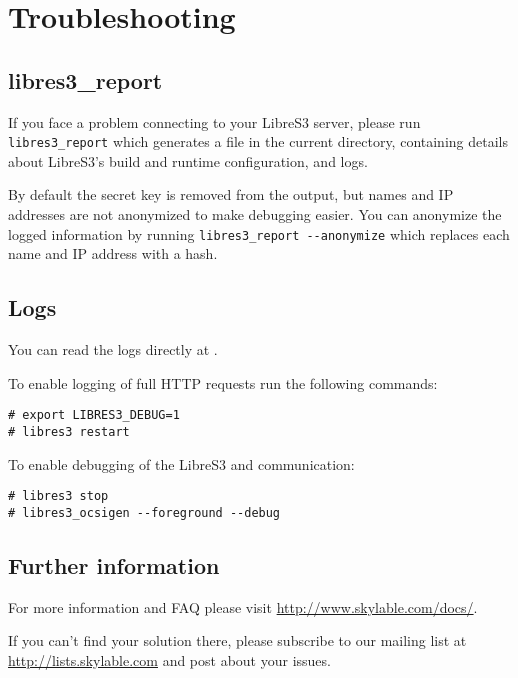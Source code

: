 \chapter{Troubleshooting}
\section{libres3\_report}

If you face a problem connecting to your LibreS3 server, please run
\verb|libres3_report| which generates a file  in the
current directory, containing details about LibreS3's build and runtime
configuration, and logs.

By default the secret key is removed from the output, but names and IP addresses
are not anonymized to make debugging easier.
You can anonymize the logged information by running
 \verb|libres3_report --anonymize| which replaces each name and IP address with
 a hash.

\section{Logs}

You can read the logs directly at .

To enable logging of full HTTP requests run the following commands:

\begin{lstlisting}
# export LIBRES3_DEBUG=1
# libres3 restart
\end{lstlisting}

To enable debugging of the LibreS3 and \SX communication:
\begin{lstlisting}
# libres3 stop
# libres3_ocsigen --foreground --debug
\end{lstlisting}

\section{Further information}

For more information and FAQ please visit \url{http://www.skylable.com/docs/}.

If you can't find your solution there, please subscribe to our mailing list
at \url{http://lists.skylable.com} and post about your issues.
